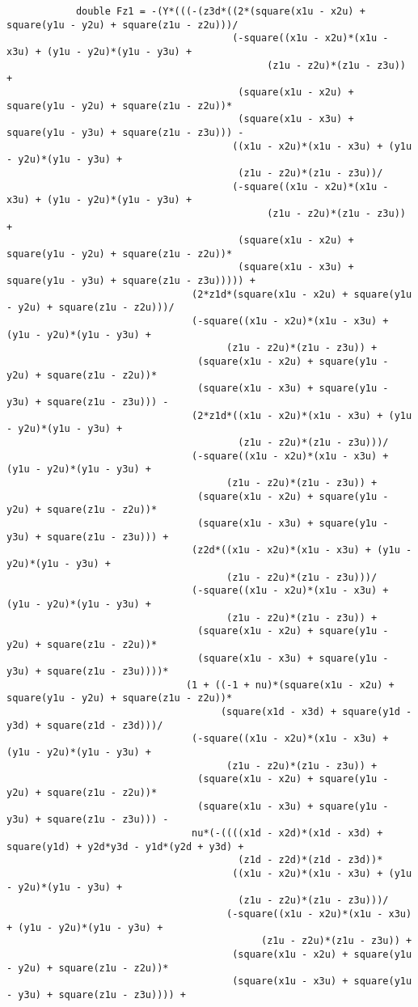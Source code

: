 \begin{lstlisting}
			double Fz1 = -(Y*(((-(z3d*((2*(square(x1u - x2u) + square(y1u - y2u) + square(z1u - z2u)))/
									   (-square((x1u - x2u)*(x1u - x3u) + (y1u - y2u)*(y1u - y3u) + 
											 (z1u - z2u)*(z1u - z3u)) + 
										(square(x1u - x2u) + square(y1u - y2u) + square(z1u - z2u))*
										(square(x1u - x3u) + square(y1u - y3u) + square(z1u - z3u))) - 
									   ((x1u - x2u)*(x1u - x3u) + (y1u - y2u)*(y1u - y3u) + 
										(z1u - z2u)*(z1u - z3u))/
									   (-square((x1u - x2u)*(x1u - x3u) + (y1u - y2u)*(y1u - y3u) + 
											 (z1u - z2u)*(z1u - z3u)) + 
										(square(x1u - x2u) + square(y1u - y2u) + square(z1u - z2u))*
										(square(x1u - x3u) + square(y1u - y3u) + square(z1u - z3u))))) + 
								(2*z1d*(square(x1u - x2u) + square(y1u - y2u) + square(z1u - z2u)))/
								(-square((x1u - x2u)*(x1u - x3u) + (y1u - y2u)*(y1u - y3u) + 
									  (z1u - z2u)*(z1u - z3u)) + 
								 (square(x1u - x2u) + square(y1u - y2u) + square(z1u - z2u))*
								 (square(x1u - x3u) + square(y1u - y3u) + square(z1u - z3u))) - 
								(2*z1d*((x1u - x2u)*(x1u - x3u) + (y1u - y2u)*(y1u - y3u) + 
										(z1u - z2u)*(z1u - z3u)))/
								(-square((x1u - x2u)*(x1u - x3u) + (y1u - y2u)*(y1u - y3u) + 
									  (z1u - z2u)*(z1u - z3u)) + 
								 (square(x1u - x2u) + square(y1u - y2u) + square(z1u - z2u))*
								 (square(x1u - x3u) + square(y1u - y3u) + square(z1u - z3u))) + 
								(z2d*((x1u - x2u)*(x1u - x3u) + (y1u - y2u)*(y1u - y3u) + 
									  (z1u - z2u)*(z1u - z3u)))/
								(-square((x1u - x2u)*(x1u - x3u) + (y1u - y2u)*(y1u - y3u) + 
									  (z1u - z2u)*(z1u - z3u)) + 
								 (square(x1u - x2u) + square(y1u - y2u) + square(z1u - z2u))*
								 (square(x1u - x3u) + square(y1u - y3u) + square(z1u - z3u))))*
							   (1 + ((-1 + nu)*(square(x1u - x2u) + square(y1u - y2u) + square(z1u - z2u))*
									 (square(x1d - x3d) + square(y1d - y3d) + square(z1d - z3d)))/
								(-square((x1u - x2u)*(x1u - x3u) + (y1u - y2u)*(y1u - y3u) + 
									  (z1u - z2u)*(z1u - z3u)) + 
								 (square(x1u - x2u) + square(y1u - y2u) + square(z1u - z2u))*
								 (square(x1u - x3u) + square(y1u - y3u) + square(z1u - z3u))) - 
								nu*(-((((x1d - x2d)*(x1d - x3d) + square(y1d) + y2d*y3d - y1d*(y2d + y3d) + 
										(z1d - z2d)*(z1d - z3d))*
									   ((x1u - x2u)*(x1u - x3u) + (y1u - y2u)*(y1u - y3u) + 
										(z1u - z2u)*(z1u - z3u)))/
									  (-square((x1u - x2u)*(x1u - x3u) + (y1u - y2u)*(y1u - y3u) + 
											(z1u - z2u)*(z1u - z3u)) + 
									   (square(x1u - x2u) + square(y1u - y2u) + square(z1u - z2u))*
									   (square(x1u - x3u) + square(y1u - y3u) + square(z1u - z3u)))) + 

\end{lstlisting}
